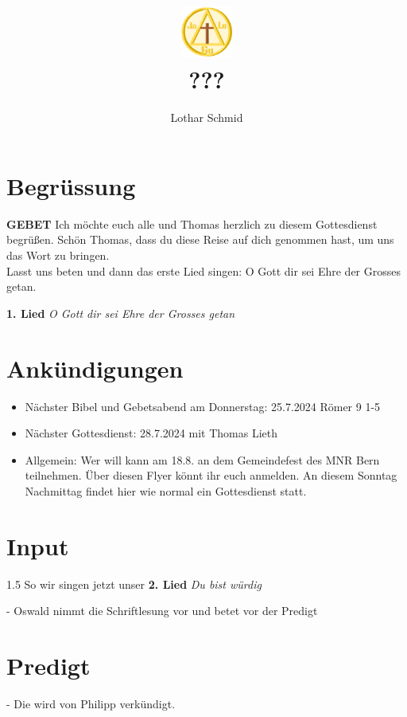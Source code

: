 \documentclass[12pt,a4paper]{scrarticle}
\title{\includegraphics[height=48pt]{assets/images/logo.png}\\???}
\author{Lothar Schmid}
\begin{document}
\maketitle
\section{Begrüssung}
\textbf{GEBET}
Ich möchte euch alle und Thomas herzlich zu diesem Gottesdienst begrüßen. Schön Thomas, dass du diese Reise auf dich genommen hast, um uns das Wort zu bringen. \\Lasst uns beten und dann das erste Lied singen: O Gott dir sei Ehre der Grosses getan.

\textbf{1. Lied}
\textit{O Gott dir sei Ehre der Grosses getan}

\section{Ankündigungen}
\begin{itemize}
    \item Nächster Bibel und Gebetsabend am Donnerstag: 25.7.2024 Römer 9 1-5
    \item Nächster Gottesdienst: 28.7.2024 mit Thomas Lieth
    \item Allgemein: Wer will kann am 18.8. an dem Gemeindefest des MNR Bern teilnehmen. Über diesen Flyer könnt ihr euch anmelden. An diesem Sonntag Nachmittag findet hier wie normal ein Gottesdienst statt.
\end{itemize}

\section{ Input }
\begin{spacing}{1.5}



\end{spacing}{1.5}
So wir singen jetzt unser \textbf{2. Lied} \textit{Du bist würdig}

- Oswald nimmt die Schriftlesung vor und betet vor der Predigt

\section{Predigt}
- Die wird von Philipp verkündigt.
\end{document}
